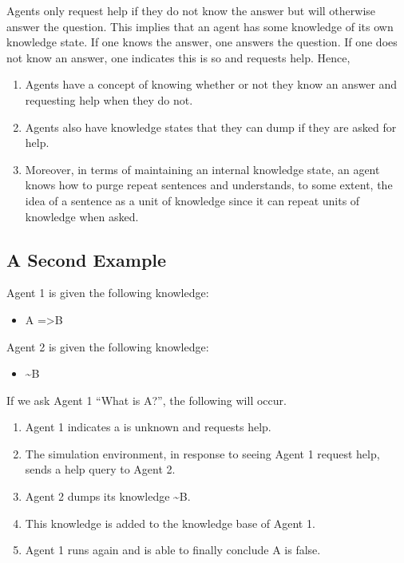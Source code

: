 \documentclass{article}
\begin{document}
Agents only request help if they do not know the answer but will otherwise answer the question. This implies that an agent has some knowledge of its own knowledge state. If one knows the answer, one answers the question. If one does not know an answer, one indicates this is so and requests help. Hence,

\begin{enumerate}
	\item Agents have a concept of knowing whether or not they know an answer and requesting help when they do not.
	\item Agents also have knowledge states that they can dump if they are asked for help.
	\item Moreover, in terms of maintaining an internal knowledge state, an agent knows how to purge repeat sentences and understands, to some extent, the idea of a sentence as a unit of knowledge since it can repeat units of knowledge when asked.
\end{enumerate}

\subsection{A Second Example}
\label{example_2}

Agent 1 is given the following knowledge:

\begin{itemize}
	\item A =\textgreater B
\end{itemize}

Agent 2 is given the following knowledge:

\begin{itemize}
	\item \textasciitilde B
\end{itemize}

If we ask Agent 1 “What is A?”, the following will occur.

\begin{enumerate}
	\item Agent 1 indicates a is unknown and requests help.
	\item The simulation environment, in response to seeing Agent 1 request help, sends a help query to Agent 2.
	\item Agent 2 dumps its knowledge \textasciitilde B.
	\item This knowledge is added to the knowledge base of Agent 1.
	\item Agent 1 runs again and is able to finally conclude A is false.
\end{enumerate}
\end{document}
